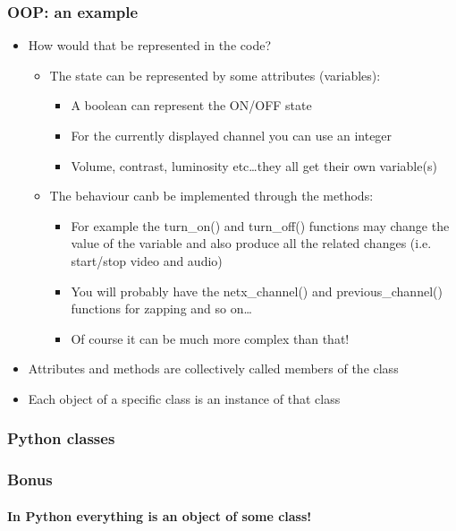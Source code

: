 \documentclass[9pt]{beamer}
\begin{document}
\begin{frame}
  \frametitle{OOP: an example}
 
  \begin{itemize}
    \item How would that be represented in the code?
    \smallskip
      \begin{itemize}
      \item The state can be represented by some attributes (variables):
      \begin{itemize}
        \item A boolean can represent the ON/OFF state
        \item For the currently displayed channel you can use an integer
        \item Volume, contrast, luminosity etc\dots they all get their own variable(s)
      \end{itemize}

      \medskip
    
      \item The behaviour canb be implemented through the methods:
      \smallskip
      \begin{itemize}
        \item For example the turn\_on() and turn\_off() functions may change the value of the variable
              and also produce all the related changes (i.e. start/stop video and audio) 
        \item You will probably have the netx\_channel() and previous\_channel() functions for zapping and so on\dots
        \item Of course it can be much more complex than that!
      \end{itemize}
    \end{itemize}
    
    \medskip
    
    \item Attributes and methods are collectively called \alert{members} of the class
    \medskip
    \item Each object of a specific class is an \alert{instance} of that class
  \end{itemize}

\end{frame}


\begin{frame}
  \frametitle{Python classes}
  
\end{frame}


\begin{frame}
  \frametitle{Bonus}
  \framesubtitle{In Python everything is an object of some class!}
  
\end{frame}
\end{document}

